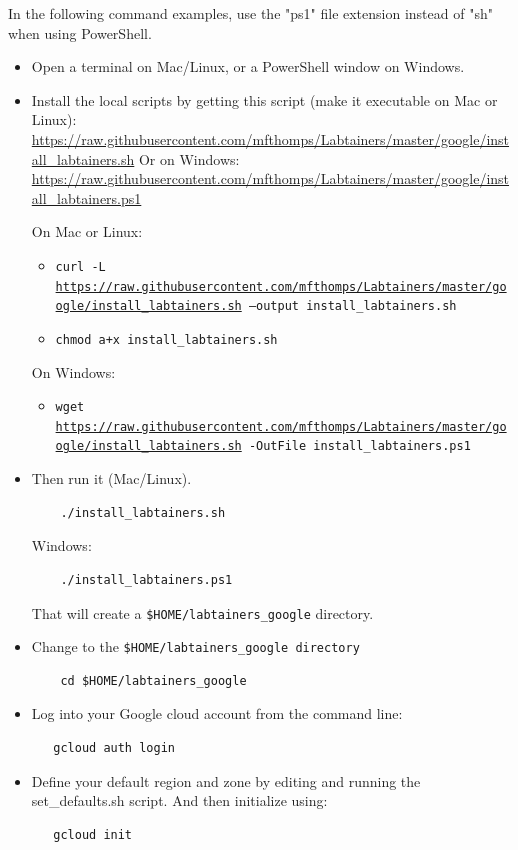 \documentclass[12pt]{article}
\begin{document}
In the following command examples, use the "ps1" file extension instead of "sh" when using PowerShell.
\begin{itemize}
\item Open a terminal on Mac/Linux, or a PowerShell window on Windows.
\item Install the local scripts by getting this script (make it executable on Mac or Linux):
\url{https://raw.githubusercontent.com/mfthomps/Labtainers/master/google/install\_labtainers.sh}
Or on Windows:
\url{https://raw.githubusercontent.com/mfthomps/Labtainers/master/google/install\_labtainers.ps1}

On Mac or Linux:
\begin{itemize}
\item {\tt curl -L \url{https://raw.githubusercontent.com/mfthomps/Labtainers/master/google/install\_labtainers.sh}  --output install\_labtainers.sh}
\item  {\tt chmod a+x install\_labtainers.sh}
\end{itemize}
\noindent On Windows:
\begin{itemize}
\item {\tt wget \url{https://raw.githubusercontent.com/mfthomps/Labtainers/master/google/install\_labtainers.sh} -OutFile install\_labtainers.ps1}
\end{itemize}

\item Then run it (Mac/Linux).   
\begin{verbatim}
    ./install_labtainers.sh
\end{verbatim}
\noindent Windows:
\begin{verbatim}
    ./install_labtainers.ps1
\end{verbatim}

\noindent That will create a {\tt \$HOME/labtainers\_google} directory.  

\item Change to the {\tt \$HOME/labtainers\_google directory}
\begin{verbatim}
    cd $HOME/labtainers_google
\end{verbatim}

\item Log into your Google cloud account from the command line:
\begin{verbatim}
   gcloud auth login
\end{verbatim}
\item Define your default region and zone by editing and running the set\_defaults.sh script. And then initialize
using:
\begin{verbatim}
   gcloud init
\end{verbatim}


\end{itemize}
\end{document}
